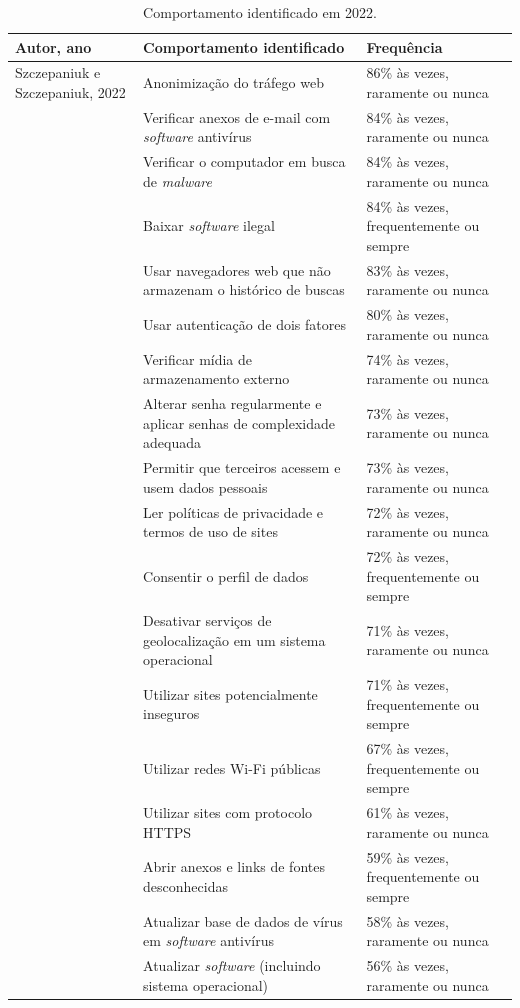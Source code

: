 \documentclass[portuguese]{textolivre}
\begin{document}
\begin{footnotesize}
\begin{longtable}{p{2cm} p{5cm} p{3cm}}
\caption{Comportamento identificado em 2022.}
\label{tab04-appendix}
\\
\toprule
Autor, ano & Comportamento identificado & Frequência \\
\midrule
Szczepaniuk e Szczepaniuk, 2022 & Anonimização do tráfego web & 86\% às vezes, raramente ou nunca \\
& Verificar anexos de e-mail com \emph{software} antivírus & 84\% às vezes, raramente ou nunca \\
& Verificar o computador em busca de \emph{malware} & 84\% às vezes, raramente ou nunca \\
& Baixar \emph{software} ilegal & 84\% às vezes, frequentemente ou sempre \\
& Usar navegadores web que não armazenam o histórico de buscas & 83\% às vezes, raramente ou nunca \\
& Usar autenticação de dois fatores & 80\% às vezes, raramente ou nunca \\
& Verificar mídia de armazenamento externo & 74\% às vezes, raramente ou nunca \\
& Alterar senha regularmente e aplicar senhas de complexidade adequada & 73\% às vezes, raramente ou nunca \\
& Permitir que terceiros acessem e usem dados pessoais & 73\% às vezes, raramente ou nunca \\
& Ler políticas de privacidade e termos de uso de sites & 72\% às vezes, raramente ou nunca \\
& Consentir o perfil de dados & 72\% às vezes, frequentemente ou sempre \\
& Desativar serviços de geolocalização em um sistema operacional & 71\% às vezes, raramente ou nunca \\
& Utilizar sites potencialmente inseguros & 71\% às vezes, frequentemente ou sempre \\
& Utilizar redes Wi-Fi públicas & 67\% às vezes, frequentemente ou sempre \\
& Utilizar sites com protocolo HTTPS & 61\% às vezes, raramente ou nunca \\
& Abrir anexos e links de fontes desconhecidas & 59\% às vezes, frequentemente ou sempre \\
& Atualizar base de dados de vírus em \emph{software} antivírus & 58\% às vezes, raramente ou nunca \\
& Atualizar \emph{software} (incluindo sistema operacional) & 56\% às vezes, raramente ou nunca \\

\end{longtable}
\end{footnotesize}
\end{document}

